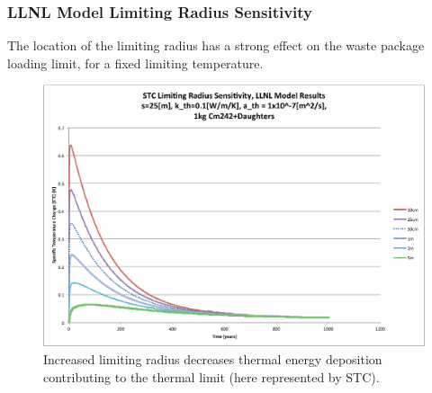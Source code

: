 \begin{frame}[ctb!]
\frametitle{LLNL Model Limiting Radius Sensitivity}
\footnotesize{
The location of the limiting radius has a strong effect on the 
waste package loading limit, for a fixed limiting temperature. 
\begin{figure}[htbp!]
\begin{center}
\includegraphics[height=0.7\textheight]{./thermal_demonstration/spacing/Cm242r_lim_sens.eps}
\end{center}
\caption[$K_{th}$ Sensitivity to $r_{lim}$]{Increased limiting radius 
decreases thermal energy deposition contributing to the thermal limit
(here represented by STC).}
\label{fig:Cm242r_lim_sens}
\end{figure}
}
\end{frame}

